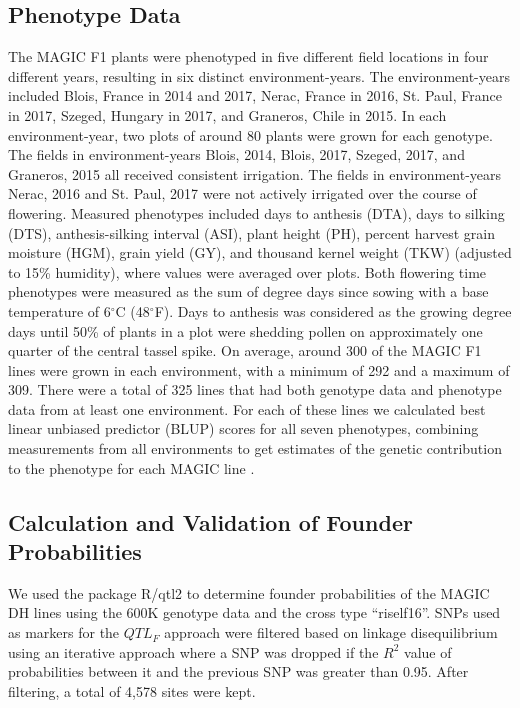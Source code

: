 \documentclass[article,9pt,twocolumn,twoside]{rilabRxiv}
\begin{document}
\subsection{Phenotype Data}
The MAGIC F1 plants were phenotyped in five different field locations in four different years, resulting in six distinct environment-years.
The environment-years included Blois, France in 2014 and 2017, Nerac, France in 2016, St. Paul, France in 2017, Szeged, Hungary in 2017, and Graneros, Chile in 2015.
In each environment-year, two plots of around 80 plants were grown for each genotype.
The fields in environment-years Blois, 2014, Blois, 2017, Szeged, 2017, and Graneros, 2015 all received consistent irrigation.
The fields in environment-years Nerac, 2016 and St. Paul, 2017 were not actively irrigated over the course of flowering.
Measured phenotypes included days to anthesis (DTA), days to silking (DTS), anthesis-silking interval (ASI), plant height (PH), percent harvest grain moisture (HGM), grain yield (GY), and thousand kernel weight (TKW) (adjusted to 15\% humidity), where values were averaged over plots.
Both flowering time phenotypes were measured as the sum of degree days since sowing with a base temperature of 6$^{\circ}$C (48$^{\circ}$F).
Days to anthesis was considered as the growing degree days until 50\% of plants in a plot were shedding pollen on approximately one quarter of the central tassel spike.
On average, around 300 of the MAGIC F1 lines were grown in each environment, with a minimum of 292 and a maximum of 309.
There were a total of 325 lines that had both genotype data and phenotype data from at least one environment.
For each of these lines we calculated best linear unbiased predictor (BLUP) scores for all seven phenotypes, combining measurements from all environments to get estimates of the genetic contribution to the phenotype for each MAGIC line \citep{Aulchenko}.


\subsection{Calculation and Validation of Founder Probabilities}
We used the package R/qtl2 \citep{Broman} to determine founder probabilities of the MAGIC DH lines using the 600K genotype data and the cross type ``riself16''.
SNPs used as  markers for the $QTL_F$ approach were filtered based on linkage disequilibrium using an iterative approach where a SNP was dropped if the $R^2$ value of probabilities between it and the previous SNP was greater than 0.95.
After filtering, a total of 4,578 sites were kept. %
\end{document}
